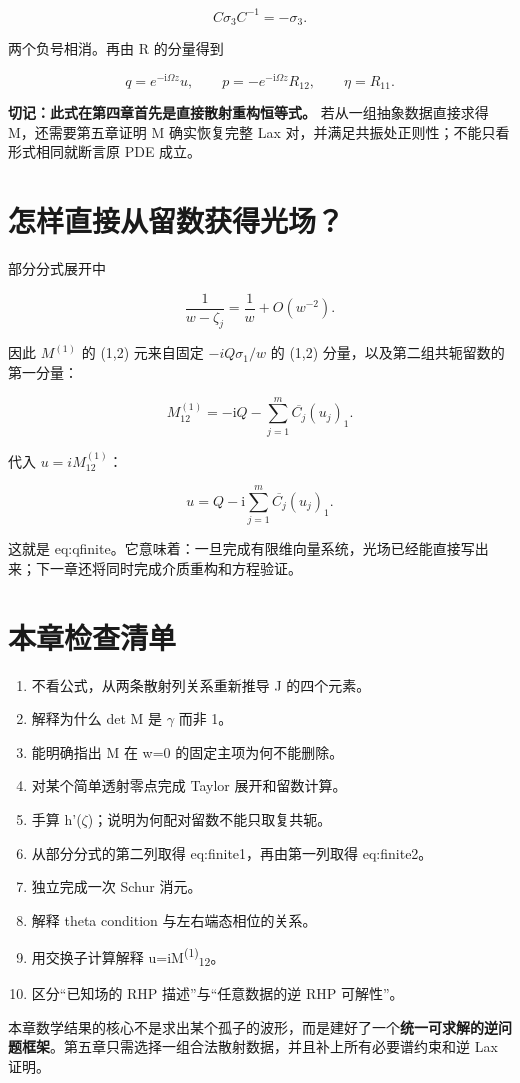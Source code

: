 \[
C\sigma_3 C^{-1}=-\sigma_3.
\]

两个负号相消。再由 R 的分量得到\par

\[
q=e^{-\mathrm{i}\Omega z}u,\qquad
p=-e^{-\mathrm{i}\Omega z}R_{12},\qquad
\eta=R_{11}.
\]

\textbf{切记：此式在第四章首先是直接散射重构恒等式。} 若从一组抽象数据直接求得 M，还需要第五章证明 M 确实恢复完整 Lax 对，并满足共振处正则性；不能只看形式相同就断言原 PDE 成立。\par

\section{怎样直接从留数获得光场？}
\par

部分分式展开中\par

\[
\dfrac{1}{w-\zeta_j}
=\dfrac{1}{w}+O(w^{-2}).
\]

因此 $M^{(1)}$ 的 (1,2) 元来自固定 $-iQ\sigma{}_{1}/w$ 的 (1,2) 分量，以及第二组共轭留数的第一分量：\par

\[
M^{(1)}_{12}
=-\mathrm{i}Q-\sum\limits_{j=1}^{m}\overline{C_j}(u_j)_1.
\]

代入 $u=iM^{(1)}_{12}$：\par

\[
\boxed{
u=Q-\mathrm{i}\sum\limits_{j=1}^{m}\overline{C_j}(u_j)_1.
}
\]

这就是 eq:qfinite。它意味着：一旦完成有限维向量系统，光场已经能直接写出来；下一章还将同时完成介质重构和方程验证。\par

\section{本章检查清单}

\begin{enumerate}[leftmargin=2em]
\item 不看公式，从两条散射列关系重新推导 J 的四个元素。
\item 解释为什么 det M 是 \ensuremath{\gamma} 而非 1。
\item 能明确指出 M 在 w=0 的固定主项为何不能删除。
\item 对某个简单透射零点完成 Taylor 展开和留数计算。
\item 手算 h'(\ensuremath{\zeta})；说明为何配对留数不能只取复共轭。
\item 从部分分式的第二列取得 eq:finite1，再由第一列取得 eq:finite2。
\item 独立完成一次 Schur 消元。
\item 解释 theta condition 与左右端态相位的关系。
\item 用交换子计算解释 u=iM\textsuperscript{(}\textsuperscript{1}\textsuperscript{)}\textsubscript{1}\textsubscript{2}。
\item 区分“已知场的 RHP 描述”与“任意数据的逆 RHP 可解性”。
\end{enumerate}

本章数学结果的核心不是求出某个孤子的波形，而是建好了一个\textbf{统一可求解的逆问题框架}。第五章只需选择一组合法散射数据，并且补上所有必要谱约束和逆 Lax 证明。\par

